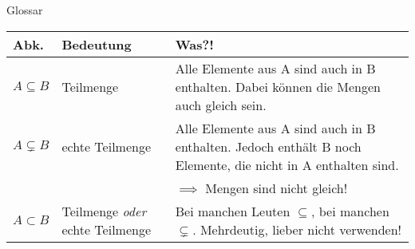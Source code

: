 \begin{frame}[fragile]{Glossar}
	\small
	\begin{tabular}{p{} p{} p{}}
		\toprule
		Abk.&Bedeutung&Was?!\\
		\midrule
		$A \subseteq B$ & Teilmenge & Alle Elemente aus A sind auch in B enthalten. Dabei können die Mengen auch gleich sein.\\
		$A \subsetneq B$ & echte Teilmenge & Alle Elemente aus A sind auch in B enthalten. Jedoch enthält B noch Elemente, die nicht in A enthalten sind.
		\\&&$\implies$ Mengen sind nicht gleich!\\
		$A \subset B$ & Teilmenge \emph{oder} echte Teilmenge & Bei manchen Leuten $\subseteq$, bei manchen $\subsetneq$. Mehrdeutig, lieber nicht verwenden!\\
		\bottomrule
	\end{tabular}
\end{frame}